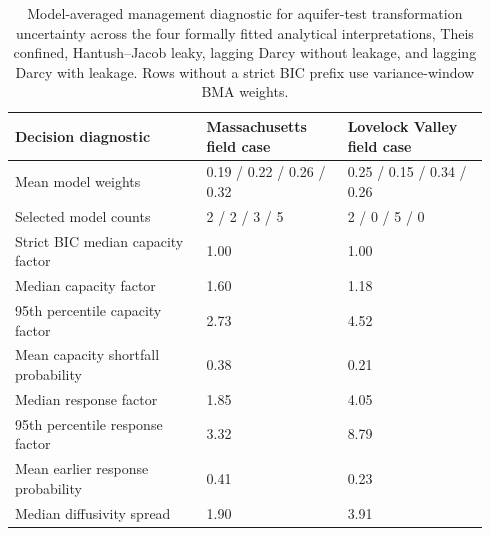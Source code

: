 \documentclass[12pt]{article}
\begin{document}
\begin{table}[!htbp]
\centering
\scriptsize
\setlength{\tabcolsep}{2.0pt}
\renewcommand{\arraystretch}{0.95}
\caption{Model-averaged management diagnostic for aquifer-test transformation uncertainty across the four formally fitted analytical interpretations, Theis confined, Hantush--Jacob leaky, lagging Darcy without leakage, and lagging Darcy with leakage. Rows without a strict BIC prefix use variance-window BMA weights.}
\label{tab:s_decisionconsequence}
\begin{tabular}{@{}p{0.38\linewidth}p{0.28\linewidth}p{0.28\linewidth}@{}}
\toprule
Decision diagnostic & Massachusetts field case & Lovelock Valley field case \\
\midrule
Mean model weights & 0.19 / 0.22 / 0.26 / 0.32 & 0.25 / 0.15 / 0.34 / 0.26 \\
Selected model counts & 2 / 2 / 3 / 5 & 2 / 0 / 5 / 0 \\
Strict BIC median capacity factor & 1.00 & 1.00 \\
Median capacity factor & 1.60 & 1.18 \\
95th percentile capacity factor & 2.73 & 4.52 \\
Mean capacity shortfall probability & 0.38 & 0.21 \\
Median response factor & 1.85 & 4.05 \\
95th percentile response factor & 3.32 & 8.79 \\
Mean earlier response probability & 0.41 & 0.23 \\
Median diffusivity spread & 1.90 & 3.91 \\
\bottomrule
\end{tabular}
\end{table}
\end{document}
